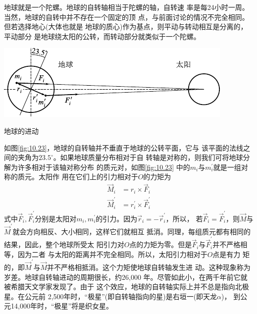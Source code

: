 地球就是一个陀螺。地球的自转轴相当于陀螺的轴，自转速
率是每24小时一周。当然，地球的自转中并不存在一个固定的顶
点，与前面讨论的情况不完全相同。但若选择地心(大体也就是
地球的质心)作为基点，则平动与转动相互是分离的，平动部分
是地球绕太阳的公转，而转动部分就类似于一个陀螺。

\vspace{1.5em}
\begin{figurex}
    \centering
    \includegraphics{figure/fig10.23}
    \caption{地球的进动}
    \label{fig:10.23}
\end{figurex}
\vspace{1.5em}

如图\ref{fig:10.23}，地球的自转轴并不垂直于地球的公转平面，它与
该平面的法线之间的夹角为$ 23.5 ^ \circ $。如果地球质量分布相对于自
转轴是对称的，则我们可将地球分解为许多相对于该轴对称分布
的质元对，如图\ref{fig:10.23} 中的$ m _ i $与$ m _ i ^ \prime $就是一组对称的质元。太阳作
用在它们上的引力相对于$ O $的力矩为
\begin{equation*}
    \begin{split}
        \vec{M} _ { i } &= r _ { i } \times \vec{F} _ i \\
        \vec{M} _ { i } ^ { \prime } &= r _ { i } ^ { \prime } \times \vec{F} _ i ^ \prime
    \end{split}
\end{equation*}
式中$ \vec{F} _ i,  \vec{F} _ i ^ \prime$分别是太阳对$ m _ i , m _ i ^ \prime $的引力。因为$ \vec{r} _ i = - \vec{r} _i ^ \prime $，所以，
若$ \vec{F} _ i = \vec{F} _ i ^ \prime $，则$\vec{M}$与$\vec{M} ^ \prime$就会方向相反、大小相同，这样它们就相互
抵消。同理，每组质元都有相同的结果，因此，整个地球所受太
阳引力对$ O $点的力矩为零。但是$ \vec{F} _ i $与$ \vec{F} _ i ^ \prime $并不严格相等，因为二者
与太阳的距离并不完全相同。所以，太阳引力相对于$ O $点是有力
矩的，即$\vec{M} ^ \prime$与$\vec{M}$并不严格相抵消。这个力矩使地球自转轴发生进
动。这种现象称为岁差。地球自转轴进动的周期很长，约26,000
年。尽管如此小，在两千年前它就被希腊天文学家发现了。由于
这个效应，地球的自转轴实际上并不总是指向北极星。在公元前
2,500年时，“极星”(即自转轴指向的星)是右垣一(即天龙$ \alpha $)，
到公元14,000年时，“极星”将是织女星。